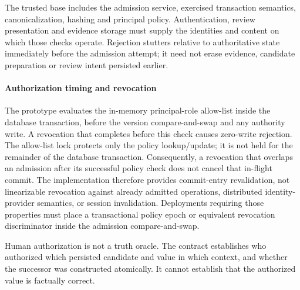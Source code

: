 \documentclass[11pt,a4paper]{article}
\begin{document}
The trusted base includes the admission service, exercised transaction semantics, canonicalization, hashing and principal policy. Authentication, review presentation and evidence storage must supply the identities and content on which those checks operate. Rejection stutters relative to authoritative state immediately before the admission attempt; it need not erase evidence, candidate preparation or review intent persisted earlier.

\paragraph{Authorization timing and revocation}
\label{app:authorization-timing}
The prototype evaluates the in-memory principal-role allow-list inside the database transaction, before the version compare-and-swap and any authority write. A revocation that completes before this check causes zero-write rejection. The allow-list lock protects only the policy lookup/update; it is not held for the remainder of the database transaction. Consequently, a revocation that overlaps an admission after its successful policy check does not cancel that in-flight commit. The implementation therefore provides commit-entry revalidation, not linearizable revocation against already admitted operations, distributed identity-provider semantics, or session invalidation. Deployments requiring those properties must place a transactional policy epoch or equivalent revocation discriminator inside the admission compare-and-swap.

Human authorization is not a truth oracle. The contract establishes who authorized which persisted candidate and value in which context, and whether the successor was constructed atomically. It cannot establish that the authorized value is factually correct.
\end{document}
